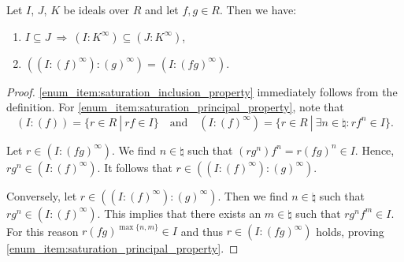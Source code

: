 \begin{propApp}
	Let $I$, $J$, $K$ be ideals over $R$ and let $f,g\in R$. Then we have:
	\begin{enumerate}[label={\upshape(\roman*)}]
		\item $I\subseteq J\ \Rightarrow\ (I:K^\infty)\subseteq(J:K^\infty)$,
		\label{enum_item:saturation_inclusion_property}
		\item $((I:(f)^\infty):(g)^\infty) = (I:(fg)^\infty)$.
		\label{enum_item:saturation_principal_property}
	\end{enumerate}
\end{propApp}
\begin{proof}
	\ref{enum_item:saturation_inclusion_property} immediately follows from the definition. For \ref{enum_item:saturation_principal_property}, note that
	$$(I:(f)) = \{r\in R\ |\ rf\in I\}\quad\text{and}\quad (I:(f)^\infty) = \{r\in R\ |\ \exists n\in\natural: rf^n\in I\}.$$
	
	Let $r\in (I:(fg)^\infty)$. We find $n\in \natural$ such that $(rg^n)f^n = r(fg)^n\in I$. Hence, $rg^n\in (I:(f)^\infty)$. It follows that $r\in((I:(f)^\infty):(g)^\infty)$.
	
	Conversely, let $r\in((I:(f)^\infty):(g)^\infty)$. Then we find $n\in \natural$ such that $rg^n\in (I:(f)^\infty)$. This implies that there exists an $m\in\natural$ such that $rg^nf^m\in I$. For this reason $r(fg)^{\max\{n,m\}}\in I$ and thus $r\in (I:(fg)^\infty)$ holds, proving \ref{enum_item:saturation_principal_property}.
\end{proof}